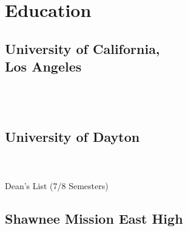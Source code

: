\documentclass[letterpaper]{deedy-resume} %
\begin{document}
\begin{minipage}[t]{0.32\textwidth} %


\section{Education} 

\subsection[UCLA]{University of California,\\ Los Angeles}

 \\
 \\

\sectionspace %


\subsection{University of Dayton}
 \\
 \\
Dean's List (7/8 Semesters) \\

\sectionspace %


\subsection{Shawnee Mission East High}

 \\

\sectionspace %



\end{minipage}
\end{document}
